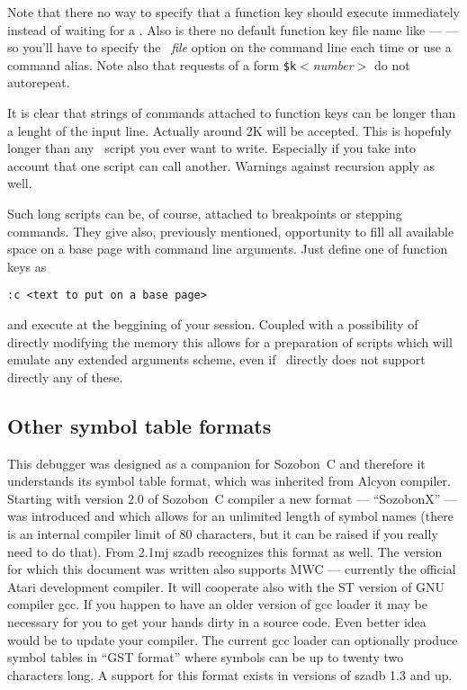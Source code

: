 Note that there no way to specify that a function key should execute
immediately instead of waiting for a . Also is there no default
function key file name 
like ---  --- so you'll have to specify the 
~{\sl file\/}
option on the command line each time or use a command alias.
Note also that requests of a form \verb|$k|{\sl $<$number$>$\/} do not
autorepeat.

It is clear that strings of commands attached to function keys
can be longer than a lenght of the input line.  Actually around
2K will be accepted.  This is hopefuly longer than any \szadb\
script you ever want to write.  Especially if you take into
account that one script can call another.  Warnings against
recursion apply as well.

Such long scripts can be, of course, attached to breakpoints
or stepping commands.  They give also, previously mentioned,
opportunity to fill all available space on a base page with
command line arguments.  Just define one of function keys as
\begin{exmpl}
	{\tt :c <text to put on a base page>}
\end{exmpl}
and execute at the beggining of your session.  Coupled with
a possibility of directly modifying the memory this allows 
for a preparation of scripts which will emulate any extended arguments
scheme, even if \szadb\ directly does not support directly any
of these.

\subsection{Other symbol table formats}

This debugger was designed as a companion for Sozobon~C and therefore
it understands its symbol table format, which was inherited from
Alcyon compiler.  Starting with version 2.0 of Sozobon~C compiler
a new format --- ``SozobonX'' --- was introduced and which allows for
an unlimited length of symbol names  (there is an internal compiler
limit of 80 characters, but it can be raised if you really need
to do that).  From 2.1mj szadb recognizes this format as well.
The version for which this document was written also supports MWC ---
currently the official Atari development compiler.
It will cooperate also  with the ST version of GNU compiler gcc.
If you happen to have an older version of gcc loader it may
be necessary for you to get your hands dirty in a source code.
Even better idea would be to update your compiler.  The current
gcc loader can optionally produce symbol tables in ``GST format''
where symbols can be up to twenty two characters long.
A support for this format exists in versions of szadb 1.3 and up.


